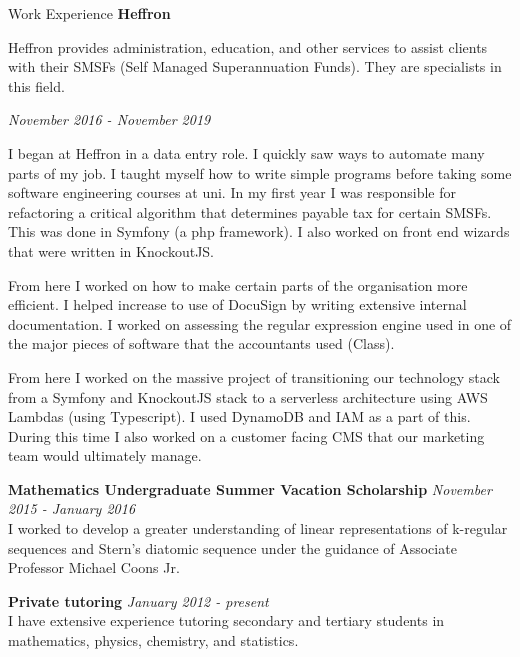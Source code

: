 \documentclass{resume} %
\begin{document}
\begin{rSection}{Work Experience}
    {\bf Heffron}

    Heffron provides administration, education, and other services to assist clients with their
    SMSFs (Self Managed Superannuation Funds). They are specialists in this field.

    \begin{adjustwidth}{2em}{}
        \begin{rSubsection}{}{\em November 2016 - November 2019}{}{}
            \item
            I began at Heffron in a data entry role. I quickly saw ways to automate many parts of my job.
            I taught myself how to write simple programs before taking some software engineering courses at uni.
            In my first year I was responsible for refactoring a critical algorithm that determines payable
            tax for certain SMSFs. This was done in Symfony (a php framework).
            I also worked on front end wizards that were written in KnockoutJS.

            From here I worked on how to make certain parts of the organisation more efficient. I helped increase
            to use of DocuSign by writing extensive internal documentation.
            I worked on assessing the regular expression engine used in one of the major pieces of software that
            the accountants used (Class).

            From here I worked on the massive project of transitioning our technology stack from a Symfony and KnockoutJS stack to a
            serverless architecture using AWS Lambdas (using Typescript). I used DynamoDB and IAM as a part of this. During this
            time I also worked on a customer facing CMS that our marketing team would ultimately manage.
        \end{rSubsection}
    \end{adjustwidth}

    {\bf Mathematics Undergraduate Summer Vacation Scholarship}
    \hfill {\em November 2015 - January 2016} \\
    I worked to develop a greater understanding of linear representations of k-regular
    sequences and Stern's diatomic sequence under the guidance of Associate Professor Michael Coons Jr.

        {\bf Private tutoring} \hfill {\em January 2012 - present} \\
    I have extensive experience tutoring secondary and tertiary students in mathematics,
    physics, chemistry, and statistics.
\end{rSection}
\end{document}
